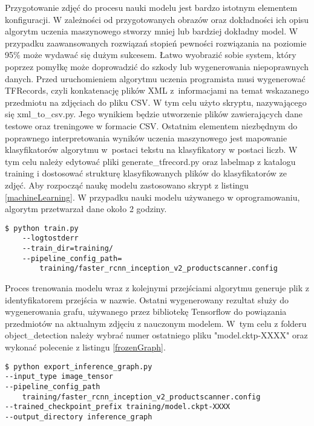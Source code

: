 Przygotowanie zdjęć do procesu nauki modelu jest bardzo istotnym elementem konfiguracji. W zależności od przygotowanych obrazów oraz dokładności ich opisu algorytm uczenia maszynowego stworzy mniej lub bardziej dokładny model. W przypadku zaawansowanych rozwiązań stopień pewności rozwiązania na poziomie 95\% może wydawać się dużym sukcesem. Łatwo wyobrazić sobie system, który poprzez pomyłkę może doprowadzić do szkody lub wygenerowania niepoprawnych danych. Przed uruchomieniem algorytmu uczenia programista musi wygenerować TFRecords, czyli konkatenację plików XML z~informacjami na temat wskazanego przedmiotu na zdjęciach do pliku CSV. W tym celu użyto skryptu, nazywającego się xml\_to\_csv.py. Jego wynikiem będzie utworzenie plików zawierających dane testowe oraz treningowe w formacie CSV. Ostatnim elementem niezbędnym do poprawnego interpretowania wyników uczenia maszynowego jest mapowanie klasyfikatorów algorytmu w~postaci tekstu na klasyfikatory w postaci liczb. W tym celu należy edytować pliki generate\_tfrecord.py oraz labelmap z katalogu training i dostosować strukturę klasyfikowanych plików do klasyfikatorów ze zdjęć. Aby rozpocząć naukę modelu zastosowano skrypt z listingu \ref{machineLearning}. W przypadku nauki modelu używanego w oprogramowaniu, algorytm przetwarzał dane około 2 godziny. 

\begin{lstlisting}[caption={Uruchomienie algorytmu uczenia maszynowego.}, label={machineLearning} ]
$ python train.py 
	--logtostderr 
	--train_dir=training/
	--pipeline_config_path=
	 	training/faster_rcnn_inception_v2_productscanner.config
\end{lstlisting}

Proces trenowania modelu wraz z kolejnymi przejściami algorytmu generuje plik z identyfikatorem przejścia w nazwie. Ostatni wygenerowany rezultat służy do wygenerowania grafu, używanego przez bibliotekę Tensorflow do powiązania przedmiotów na aktualnym zdjęciu z nauczonym modelem. W~tym celu z folderu object\_detection należy wybrać numer ostatniego pliku "model.cktp-XXXX" oraz wykonać polecenie z listingu \ref{frozenGraph}.

\begin{lstlisting}[caption={Wygenerowanie grafu modelu uczenia.}, label={frozenGraph} ]
$ python export_inference_graph.py 
--input_type image_tensor 
--pipeline_config_path 
	training/faster_rcnn_inception_v2_productscanner.config 
--trained_checkpoint_prefix training/model.ckpt-XXXX 
--output_directory inference_graph
\end{lstlisting}

